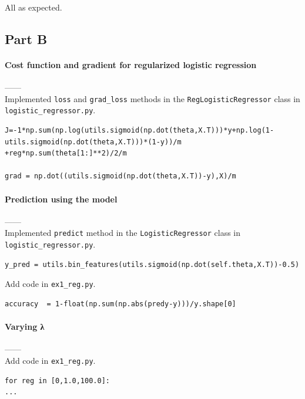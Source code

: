 \documentclass{article}
\begin{document}
All as expected.
\subsection{Part B}
\paragraph{Cost function and gradient for regularized logistic regression\\}
------\\
Implemented  \verb|loss| and  \verb|grad_loss| methods in the  \verb|RegLogisticRegressor| class in   \verb|logistic_regressor.py|.
\begin{tiny}
\begin{lstlisting} 
J=-1*np.sum(np.log(utils.sigmoid(np.dot(theta,X.T)))*y+np.log(1-utils.sigmoid(np.dot(theta,X.T)))*(1-y))/m
+reg*np.sum(theta[1:]**2)/2/m

grad = np.dot((utils.sigmoid(np.dot(theta,X.T))-y),X)/m

\end{lstlisting}
\end{tiny}
\paragraph{Prediction using the model\\}
------\\
Implemented \verb|predict| method in the  \verb|LogisticRegressor| class in \verb|logistic_regressor.py|.

\begin{tiny}
\begin{lstlisting}
y_pred = utils.bin_features(utils.sigmoid(np.dot(self.theta,X.T))-0.5)
\end{lstlisting}
\end{tiny}
Add code in \verb|ex1_reg.py|.


\begin{tiny}
\begin{lstlisting}
accuracy  = 1-float(np.sum(np.abs(predy-y)))/y.shape[0]
\end{lstlisting}
\end{tiny}
\paragraph{Varying λ\\}
------\\
Add code in \verb|ex1_reg.py|.
\begin{tiny}
\begin{lstlisting}
for reg in [0,1.0,100.0]:
...
\end{lstlisting}
\end{tiny}
\end{document}
